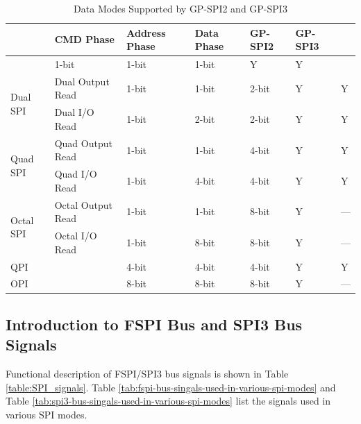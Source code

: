 \documentclass[main\_\_EN.tex]{subfiles}
\begin{document}
\begin{longtable}{|l|l|l|l|l|l|l|}
\caption{Data Modes Supported by GP-SPI2 and GP-SPI3}
\label{tab:data-modes}\\
\hline
\rowcolor{lightgray}
\multicolumn{2}{|l|}{\textbf{Supported Mode}}            & \textbf{CMD Phase}& \textbf{Address Phase}& \textbf{Data Phase}& \textbf{GP-SPI2} & \textbf{GP-SPI3} \\ \hline
\endfirsthead

    \endlastfoot
\multicolumn{2}{|l|}{1-bit SPI}                       & 1-bit   & 1-bit       & 1-bit    & Y       & Y       \\ \hline
\multirow{2}{*}{Dual   SPI} & Dual Output Read  & 1-bit   & 1-bit       & 2-bit    & Y       & Y      \\ \cline{2-7}
                            & Dual I/O Read     & 1-bit   & 2-bit       & 2-bit    & Y       & Y     \\ \hline
\multirow{2}{*}{Quad SPI}   & Quad Output Read  & 1-bit   & 1-bit       & 4-bit    & Y       & Y      \\ \cline{2-7}
                            & Quad I/O Read     & 1-bit   & 4-bit       & 4-bit    & Y       & Y      \\ \hline
\multirow{2}{*}{Octal SPI}  & Octal Output Read & 1-bit   & 1-bit       & 8-bit    & Y       & ---      \\ \cline{2-7}
                            & Octal I/O Read    & 1-bit   & 8-bit       & 8-bit    & Y       & ---      \\ \hline
\multicolumn{2}{|l|}{QPI}                       & 4-bit   & 4-bit       & 4-bit    & Y       & Y      \\ \hline
\multicolumn{2}{|l|}{OPI}                       & 8-bit   & 8-bit       & 8-bit    & Y       & ---      \\ \hline
\end{longtable}



\subsection{Introduction to FSPI Bus and SPI3 Bus Signals}

Functional description of FSPI/SPI3 bus signals is shown in Table \ref{table:SPI_signals}. Table \ref{tab:fspi-bus-singals-used-in-various-spi-modes} and Table \ref{tab:spi3-bus-singals-used-in-various-spi-modes} list the signals used in various SPI modes.
\end{document}
